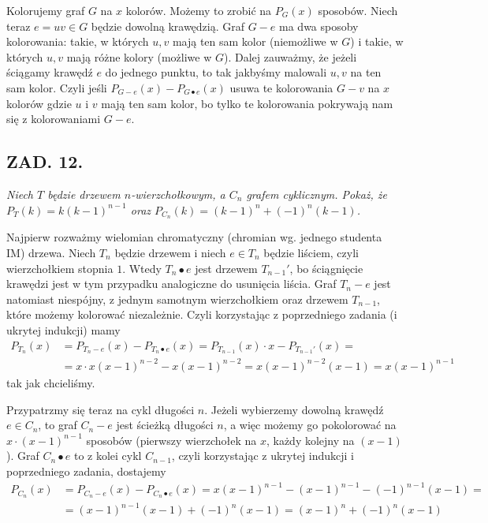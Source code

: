 \documentclass{article}
\begin{document}
\medskip

Kolorujemy graf $G$ na $x$ kolorów. Możemy to zrobić na $P_G(x)$ sposobów. Niech teraz $e=uv\in G$ będzie dowolną krawędzią. Graf $G-e$ ma dwa sposoby kolorowania: takie, w których $u,v$ mają ten sam kolor (niemożliwe w $G$) i takie, w których $u,v$ mają różne kolory (możliwe w $G$). Dalej zauważmy, że jeżeli ściągamy krawędź $e$ do jednego punktu, to tak jakbyśmy malowali $u,v$ na ten sam kolor. Czyli jeśli $P_{G-e}(x)-P_{G\bullet e}(x)$ usuwa te kolorowania $G-v$ na $x$ kolorów gdzie $u$ i $v$ mają ten sam kolor, bo tylko te kolorowania pokrywają nam się z kolorowaniami $G-e$.

\subsection*{ZAD. 12.}
\emph{Niech $T$ będzie drzewem $n$-wierzchołkowym, a $C_n$ grafem cyklicznym. Pokaż, że $P_T(k)=k(k-1)^{n-1}$ oraz $P_{C_n}(k)=(k-1)^n+(-1)^n(k-1)$.}
\medskip

\medskip

Najpierw rozważmy wielomian chromatyczny (chromian wg. jednego studenta IM) drzewa. Niech $T_n$ będzie drzewem i niech $e\in T_n$ będzie liściem, czyli wierzchołkiem stopnia $1$. Wtedy $T_n\bullet e$ jest drzewem $T_{n-1}'$, bo ściągnięcie krawędzi jest w tym przypadku analogiczne do usunięcia liścia. Graf $T_n-e$ jest natomiast niespójny, z jednym samotnym wierzchołkiem oraz drzewem $T_{n-1}$, które możemy kolorować niezależnie. Czyli korzystając z poprzedniego zadania (i ukrytej indukcji) mamy
\begin{align*}
    P_{T_n}(x)&=P_{T_n-e}(x)-P_{T_n\bullet e}(x)=P_{T_{n-1}}(x)\cdot x-P_{T_{n-1}'}(x)=\\
    &=x\cdot x(x-1)^{n-2}-x(x-1)^{n-2}=x(x-1)^{n-2}(x-1)=x(x-1)^{n-1}
\end{align*}
tak jak chcieliśmy.
\bigskip

\bigskip

Przypatrzmy się teraz na cykl długości $n$. Jeżeli wybierzemy dowolną krawędź $e\in C_n$, to graf $C_n-e$ jest ścieżką długości $n$, a więc możemy go pokolorować na $x\cdot(x-1)^{n-1}$ sposobów (pierwszy wierzchołek na $x$, każdy kolejny na $(x-1)$). Graf $C_n\bullet e$ to z kolei cykl $C_{n-1}$, czyli korzystając z ukrytej indukcji i poprzedniego zadania, dostajemy
\begin{align*}
    P_{C_n}(x)&=P_{C_n-e}(x)-P_{C_n\bullet e}(x)=x(x-1)^{n-1}-(x-1)^{n-1}-(-1)^{n-1}(x-1)=\\
    &=(x-1)^{n-1}(x-1)+(-1)^n(x-1)=(x-1)^n+(-1)^n(x-1)
\end{align*}
\end{document}
